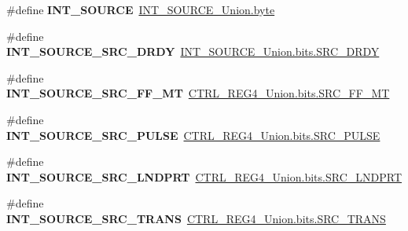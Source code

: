 \begin{DoxyCompactItemize}
\item 
\hypertarget{group__accel__module_ga06206757c9548bd8bfe8a318ba4fea62}{}\#define {\bfseries I\+N\+T\+\_\+\+S\+O\+U\+R\+C\+E}~\hyperlink{accel_8c_a96f44d20f1dbf1c8785a7bc99a46164c}{I\+N\+T\+\_\+\+S\+O\+U\+R\+C\+E\+\_\+\+Union.\+byte}\label{group__accel__module_ga06206757c9548bd8bfe8a318ba4fea62}

\item 
\hypertarget{group__accel__module_ga4aa8383d698a71fdde7a65d341a7fb22}{}\#define {\bfseries I\+N\+T\+\_\+\+S\+O\+U\+R\+C\+E\+\_\+\+S\+R\+C\+\_\+\+D\+R\+D\+Y}~\hyperlink{accel_8c_ac39436b463ef99cb345056424d3534ae}{I\+N\+T\+\_\+\+S\+O\+U\+R\+C\+E\+\_\+\+Union.\+bits.\+S\+R\+C\+\_\+\+D\+R\+D\+Y}\label{group__accel__module_ga4aa8383d698a71fdde7a65d341a7fb22}

\item 
\hypertarget{group__accel__module_ga1712c6efcb6cef5c4ac52f92c9fe17c9}{}\#define {\bfseries I\+N\+T\+\_\+\+S\+O\+U\+R\+C\+E\+\_\+\+S\+R\+C\+\_\+\+F\+F\+\_\+\+M\+T}~\hyperlink{accel_8c_a77f29426c05f9cb1462324f32c4ed4ae}{C\+T\+R\+L\+\_\+\+R\+E\+G4\+\_\+\+Union.\+bits.\+S\+R\+C\+\_\+\+F\+F\+\_\+\+M\+T}\label{group__accel__module_ga1712c6efcb6cef5c4ac52f92c9fe17c9}

\item 
\hypertarget{group__accel__module_ga8068521ad5a318a5a8503345fdc3ec59}{}\#define {\bfseries I\+N\+T\+\_\+\+S\+O\+U\+R\+C\+E\+\_\+\+S\+R\+C\+\_\+\+P\+U\+L\+S\+E}~\hyperlink{accel_8c_aee3a9487c1e1ad2ec18019bb310966f5}{C\+T\+R\+L\+\_\+\+R\+E\+G4\+\_\+\+Union.\+bits.\+S\+R\+C\+\_\+\+P\+U\+L\+S\+E}\label{group__accel__module_ga8068521ad5a318a5a8503345fdc3ec59}

\item 
\hypertarget{group__accel__module_gabaf7a35d9d86244bb5fe74b6e70acd42}{}\#define {\bfseries I\+N\+T\+\_\+\+S\+O\+U\+R\+C\+E\+\_\+\+S\+R\+C\+\_\+\+L\+N\+D\+P\+R\+T}~\hyperlink{accel_8c_af8b052367f8eb2c4989475c07cbd75f1}{C\+T\+R\+L\+\_\+\+R\+E\+G4\+\_\+\+Union.\+bits.\+S\+R\+C\+\_\+\+L\+N\+D\+P\+R\+T}\label{group__accel__module_gabaf7a35d9d86244bb5fe74b6e70acd42}

\item 
\hypertarget{group__accel__module_gac19c5e885d22ca2501b860a12dd73d8a}{}\#define {\bfseries I\+N\+T\+\_\+\+S\+O\+U\+R\+C\+E\+\_\+\+S\+R\+C\+\_\+\+T\+R\+A\+N\+S}~\hyperlink{accel_8c_ae0b2f75a4b308f31740c4a1474249d74}{C\+T\+R\+L\+\_\+\+R\+E\+G4\+\_\+\+Union.\+bits.\+S\+R\+C\+\_\+\+T\+R\+A\+N\+S}\label{group__accel__module_gac19c5e885d22ca2501b860a12dd73d8a}


\end{DoxyCompactItemize}
